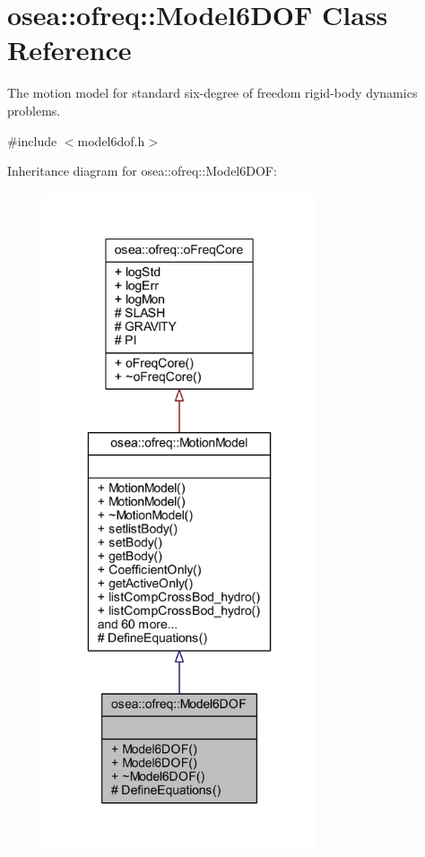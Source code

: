 \hypertarget{classosea_1_1ofreq_1_1_model6_d_o_f}{\section{osea\-:\-:ofreq\-:\-:Model6\-D\-O\-F Class Reference}
\label{classosea_1_1ofreq_1_1_model6_d_o_f}
}


The motion model for standard six-\/degree of freedom rigid-\/body dynamics problems.  




{\ttfamily \#include $<$model6dof.\-h$>$}



Inheritance diagram for osea\-:\-:ofreq\-:\-:Model6\-D\-O\-F\-:
\nopagebreak
\begin{figure}[H]
\begin{center}
\leavevmode
\includegraphics[height=550pt]{classosea_1_1ofreq_1_1_model6_d_o_f__inherit__graph}
\end{center}
\end{figure}
